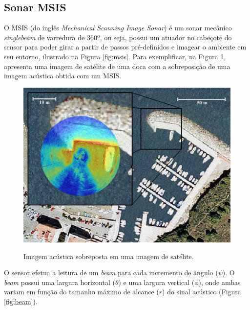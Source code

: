 \subsection{Sonar MSIS}
\label{sec:msis}
O MSIS (do inglês \textit{Mechanical Scanning Image Sonar}) é um sonar mecânico \textit{singlebeam} de varredura de 360º, ou seja, possui um atuador no cabeçote do sensor para poder girar a partir de passos pré-definidos e imagear o ambiente em seu entorno, ilustrado na Figura \ref{fig:msis}. 
Para exemplificar, na Figura \ref{fig:msis-image}, apresenta uma imagem de satélite de uma doca com a sobreposição de uma imagem acústica obtida com um MSIS.

\begin{figure}[H]
    \centering
    \caption{Imagem acústica sobreposta em uma imagem de satélite.}
    \includegraphics[scale=0.3]{dados/figuras/msis_image.png}
    \label{fig:msis-image}
\end{figure}

O sensor efetua a leitura de um \textit{beam} para cada incremento de ângulo ($\psi$). 
O \textit{beam} possui uma largura horizontal ($\theta$) e uma largura vertical ($\phi$), onde ambas variam em função do tamanho máximo de alcance ($r$) do sinal acústico (Figura \ref{fig:beam}).

